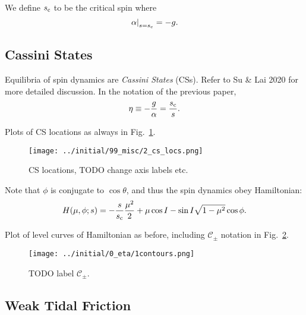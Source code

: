 \documentclass[twocolumn]{aastex63}
\newcommand*{\at}[1]{\left.#1\right|}
\begin{document}
We define $s_{\rm c}$ to be the critical spin where
\begin{equation}
    \at{\alpha}_{s = s_{\rm c}} = -g.
\end{equation}

\subsection{Cassini States}\label{ss:cs_theory}

Equilibria of spin dynamics are \emph{Cassini States} (CSs). Refer to Su \& Lai
2020 for more detailed discussion. In the notation of the previous paper,
\begin{equation}
    \eta \equiv -\frac{g}{\alpha} = \frac{s_{\rm c}}{s}.
\end{equation}

Plots of CS locations as always in Fig.~\ref{fig:cs_locs}.
\begin{figure}
    \centering
    \texttt{[image: ../initial/99\_misc/2\_cs\_locs.png]}
    \caption{CS locations, TODO change axis labels etc.}\label{fig:cs_locs}
\end{figure}

Note that $\phi$ is conjugate to $\cos \theta$, and thus the spin dynamics
obey Hamiltonian:
\begin{equation}
    H(\mu, \phi; s) = -\frac{s}{s_{\rm c}}\frac{\mu^2}{2}
        + \mu \cos I - \sin I \sqrt{1 - \mu^2}\cos \phi.
\end{equation}

Plot of level curves of Hamiltonian as before, including $\mathcal{C}_{\pm}$
notation in Fig.~\ref{fig:1contours}.
\begin{figure}
    \centering
    \texttt{[image: ../initial/0\_eta/1contours.png]}
    \caption{TODO label $\mathcal{C}_{\pm}$.}\label{fig:1contours}
\end{figure}

\subsection{Weak Tidal Friction}\label{ss:weak_tides}
\end{document}
